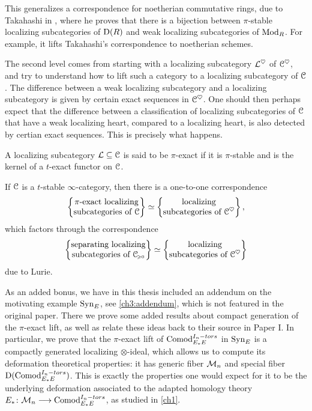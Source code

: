 This generalizes a correspondence for noetherian commutative rings, due to Takahashi in \cite{takahashi_2009}, where he proves that there is a bijection between $\pi$-stable localizing subcategories of $\mathrm{D}(R)$ and weak localizing subcategories of $\mathrm{Mod}_R$. For example, it lifts Takahashi's correspondence to noetherian schemes. 

The second level comes from starting with a localizing subcategory $\mathcal{L}^\heartsuit$ of $\EuScript{C}^\heartsuit$, and try to understand how to lift such a category to a localizing subcategory of $\EuScript{C}$. The difference between a weak localizing subcategory and a localizing subcategory is given by certain exact sequences in $\EuScript{C}^\heartsuit$. One should then perhaps expect that the difference between a classification of localizing subcategories of $\EuScript{C}$ that have a weak localizing heart, compared to a localizing heart, is also detected by certian exact sequences. This is precisely what happens. 

A localizing subcategory $\mathcal{L}\subseteq \EuScript{C}$ is said to be $\pi$-exact if it is $\pi$-stable and is the kernel of a $t$-exact functor on $\EuScript{C}$. 

\begin{theorem}
    If $\EuScript{C}$ is a $t$-stable $\infty$-category, then there is a one-to-one correspondence
    \[\left\{ \begin{matrix} \pi\text{-exact localizing}\\ \text{subcategories of }\EuScript{C} \end{matrix} \right\} \simeq \left\{ \begin{matrix} \text{localizing}\\ \text{subcategories of }\EuScript{C}^\heartsuit \end{matrix} \right\},\]
    which factors through the correspondence
    \[\left\{ \begin{matrix} \text{separating localizing}\\ \text{subcategories of }\EuScript{C}_{\hspace{-1pt}\scriptscriptstyle\geqslant 0} \end{matrix} \right\} \simeq \left\{ \begin{matrix} \text{localizing}\\ \text{subcategories of }\EuScript{C}^\heartsuit \end{matrix} \right\}\]
    due to Lurie.  
\end{theorem}

As an added bonus, we have in this thesis included an addendum on the motivating example $\mathrm{Syn}_E$, see \cref{ch3:addendum}, which is not featured in the original paper. There we prove some added results about compact generation of the $\pi$-exact lift, as well as relate these ideas back to their source in Paper I. In particular, we prove that the $\pi$-exact lift of $\mathrm{Comod}_{E_*E}^{I_n-tors}$ in $\mathrm{Syn}_{E}$ is a compactly generated localizing $\otimes$-ideal, which allows us to compute its deformation theoretical properties: it has generic fiber $\mathcal{M}_{n}$ and special fiber $\mathrm{D}(\mathrm{Comod}_{E_*E}^{I_n-tors})$. This is exactly the properties one would expect for it to be the underlying deformation associated to the adapted homology theory $E_* \colon \mathcal{M}_{n} \longrightarrow \mathrm{Comod}_{E_*E}^{I_n-tors}$, as studied in \cref{ch1}. 


